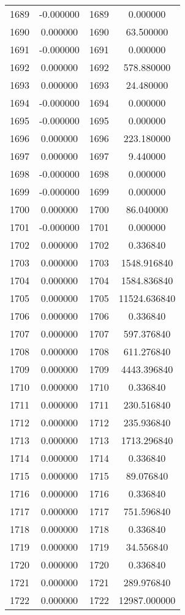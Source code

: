 \documentclass[12pt]{article}
\begin{document}
\begin{longtable}{@{}cccc@{}}
1689 & -0.000000 & 1689 & 0.000000 \\
1690 & 0.000000 & 1690 & 63.500000 \\
1691 & -0.000000 & 1691 & 0.000000 \\
1692 & 0.000000 & 1692 & 578.880000 \\
1693 & 0.000000 & 1693 & 24.480000 \\
1694 & -0.000000 & 1694 & 0.000000 \\
1695 & -0.000000 & 1695 & 0.000000 \\
1696 & 0.000000 & 1696 & 223.180000 \\
1697 & 0.000000 & 1697 & 9.440000 \\
1698 & -0.000000 & 1698 & 0.000000 \\
1699 & -0.000000 & 1699 & 0.000000 \\
1700 & 0.000000 & 1700 & 86.040000 \\
1701 & -0.000000 & 1701 & 0.000000 \\
1702 & 0.000000 & 1702 & 0.336840 \\
1703 & 0.000000 & 1703 & 1548.916840 \\
1704 & 0.000000 & 1704 & 1584.836840 \\
1705 & 0.000000 & 1705 & 11524.636840 \\
1706 & 0.000000 & 1706 & 0.336840 \\
1707 & 0.000000 & 1707 & 597.376840 \\
1708 & 0.000000 & 1708 & 611.276840 \\
1709 & 0.000000 & 1709 & 4443.396840 \\
1710 & 0.000000 & 1710 & 0.336840 \\
1711 & 0.000000 & 1711 & 230.516840 \\
1712 & 0.000000 & 1712 & 235.936840 \\
1713 & 0.000000 & 1713 & 1713.296840 \\
1714 & 0.000000 & 1714 & 0.336840 \\
1715 & 0.000000 & 1715 & 89.076840 \\
1716 & 0.000000 & 1716 & 0.336840 \\
1717 & 0.000000 & 1717 & 751.596840 \\
1718 & 0.000000 & 1718 & 0.336840 \\
1719 & 0.000000 & 1719 & 34.556840 \\
1720 & 0.000000 & 1720 & 0.336840 \\
1721 & 0.000000 & 1721 & 289.976840 \\
1722 & 0.000000 & 1722 & 12987.000000 \\

\end{longtable}
\end{document}

